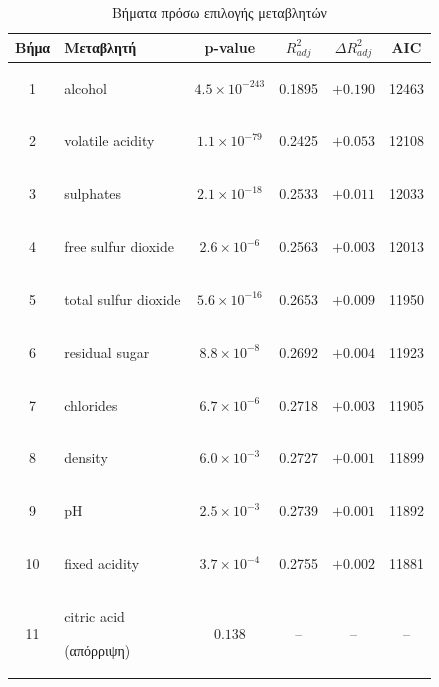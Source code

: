 \documentclass[12pt,a4paper]{article}
\begin{document}
\begin{table}[H]
\centering
\caption{Βήματα πρόσω επιλογής μεταβλητών}
\label{tab:forward}
\small
\begin{tabular}{clcccc}
\toprule
\textbf{Βήμα} & \textbf{Μεταβλητή} & \textbf{p-value} & $R^2_{adj}$ & $\Delta R^2_{adj}$ & \textbf{AIC} \\
\midrule
1  & \begin{english}alcohol\end{english}              & $4.5 \times 10^{-243}$ & 0.1895 & $+0.190$ & 12463 \\
2  & \begin{english}volatile acidity\end{english}     & $1.1 \times 10^{-79}$  & 0.2425 & $+0.053$ & 12108 \\
3  & \begin{english}sulphates\end{english}            & $2.1 \times 10^{-18}$  & 0.2533 & $+0.011$ & 12033 \\
4  & \begin{english}free sulfur dioxide\end{english}  & $2.6 \times 10^{-6}$   & 0.2563 & $+0.003$ & 12013 \\
5  & \begin{english}total sulfur dioxide\end{english} & $5.6 \times 10^{-16}$  & 0.2653 & $+0.009$ & 11950 \\
6  & \begin{english}residual sugar\end{english}       & $8.8 \times 10^{-8}$   & 0.2692 & $+0.004$ & 11923 \\
7  & \begin{english}chlorides\end{english}            & $6.7 \times 10^{-6}$   & 0.2718 & $+0.003$ & 11905 \\
8  & \begin{english}density\end{english}              & $6.0 \times 10^{-3}$   & 0.2727 & $+0.001$ & 11899 \\
9  & \begin{english}pH\end{english}                   & $2.5 \times 10^{-3}$   & 0.2739 & $+0.001$ & 11892 \\
10 & \begin{english}fixed acidity\end{english}        & $3.7 \times 10^{-4}$   & 0.2755 & $+0.002$ & 11881 \\
\midrule
11 & \begin{english}citric acid\end{english} (απόρριψη) & $0.138$              & --     & --       & --    \\
\bottomrule
\end{tabular}
\end{table}
\end{document}

